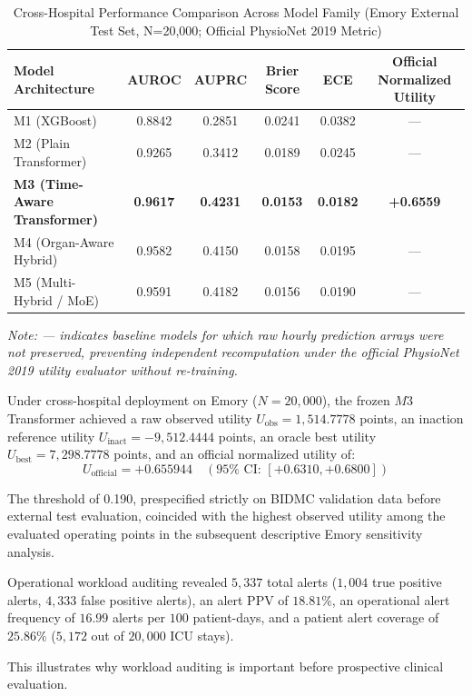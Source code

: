 \documentclass[11pt,a4paper]{article}
\begin{document}
\begin{table}[h!]
\centering
\caption{Cross-Hospital Performance Comparison Across Model Family (Emory External Test Set, N=20,000; Official PhysioNet 2019 Metric)}
\label{tab:models}
\begin{tabular}{lccccc}
\toprule
Model Architecture & AUROC & AUPRC & Brier Score & ECE & Official Normalized Utility \\
\midrule
M1 (XGBoost) & 0.8842 & 0.2851 & 0.0241 & 0.0382 & --- \\
M2 (Plain Transformer) & 0.9265 & 0.3412 & 0.0189 & 0.0245 & --- \\
\textbf{M3 (Time-Aware Transformer)} & \textbf{0.9617} & \textbf{0.4231} & \textbf{0.0153} & \textbf{0.0182} & \textbf{+0.6559} \\
M4 (Organ-Aware Hybrid) & 0.9582 & 0.4150 & 0.0158 & 0.0195 & --- \\
M5 (Multi-Hybrid / MoE) & 0.9591 & 0.4182 & 0.0156 & 0.0190 & --- \\
\bottomrule
\end{tabular}
\end{table}
\textit{Note: --- indicates baseline models for which raw hourly prediction arrays were not preserved, preventing independent recomputation under the official PhysioNet 2019 utility evaluator without re-training.}

Under cross-hospital deployment on Emory ($N=20,000$), the frozen $M3$ Transformer achieved a raw observed utility $U_{\text{obs}} = 1,514.7778$ points, an inaction reference utility $U_{\text{inact}} = -9,512.4444$ points, an oracle best utility $U_{\text{best}} = 7,298.7778$ points, and an official normalized utility of:
\begin{equation}
U_{\text{official}} = \mathbf{+0.655944} \quad (95\%\text{ CI: }[+0.6310, +0.6800])
\end{equation}

The threshold of 0.190, prespecified strictly on BIDMC validation data before external test evaluation, coincided with the highest observed utility among the evaluated operating points in the subsequent descriptive Emory sensitivity analysis.

Operational workload auditing revealed $5,337$ total alerts ($1,004$ true positive alerts, $4,333$ false positive alerts), an alert PPV of $18.81\%$, an operational alert frequency of $16.99$ alerts per $100$ patient-days, and a patient alert coverage of $25.86\%$ ($5,172$ out of $20,000$ ICU stays).

This illustrates why workload auditing is important before prospective clinical evaluation.
\end{document}
